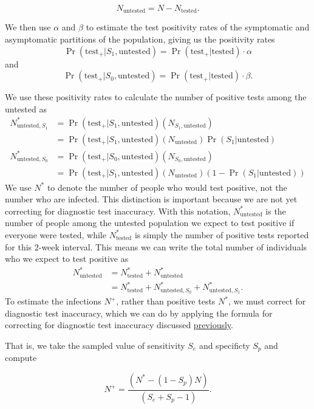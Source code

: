 \documentclass[12pt,twoside]{smiththesis}
\begin{document}
\[ N_{\text{untested}} =  N - N_{\text{tested}} .\]

We then use \(\alpha\) and \(\beta\) to estimate the test positivity rates of the symptomatic and asymptomatic partitions of the population, giving us the positivity rates
\[ \Pr( \text{test}_+ | S_1, \text{untested})  = \Pr( \text{test}_+ | \text{tested}) \cdot  \alpha  \]
and
\[ \Pr( \text{test}_+ | S_0, \text{untested})  = \Pr( \text{test}_+ | \text{tested}) \cdot  \beta. \]

We use these positivity rates to calculate the number of positive tests among the untested as
\begin{align*}
N^*_{\text{untested},S_1} &= \Pr( \text{test}_+ | S_1, \text{untested}) ( N_{S_1,\text{untested}}) \\
&= \Pr( \text{test}_+ | S_1, \text{untested}) (N_{\text{untested}} ) \Pr(S_1|\text{untested})\\
N^*_{\text{untested},S_0} &= \Pr( \text{test}_+ | S_0, \text{untested}) ( N_{S_0,\text{untested}})\\
&= \Pr( \text{test}_+ | S_1, \text{untested}) (N_{\text{untested}} ) (1- \Pr(S_1|\text{untested}))
\end{align*}
We use \(N^*\) to denote the number of people who would test positive, not the number who are infected. This distinction is important because we are not yet correcting for diagnostic test inaccuracy. With this notation, \(N^*_{\text{untested}}\) is the number of people among the untested population we expect to test positive if everyone were tested, while \(N^*_{\text{tested}}\) is simply the number of positive tests reported for this 2-week interval. This means we can write the total number of individuals who we expect to test positive as
\begin{align*}
 N^*_{\text{untested}}
 &= N^*_{\text{tested}} + N^*_{\text{untested}} \\
 &= N^*_{\text{tested}} + N^*_{\text{untested}, S_0} + N^*_{\text{untested}, S_1}.
\end{align*}
To estimate the infections \(N^+\), rather than positive tests \(N^*\), we must correct for diagnostic test inaccuracy, which we can do by applying the formula for correcting for diagnostic test inaccuracy discussed \protect\hyperlink{correct-test-inaccuracy}{previously}.

That is, we take the sampled value of sensitivity \(S_e\) and specificty \(S_p\) and compute

\[N^+ = \dfrac{(N^* - (1 - S_p) N) } { (S_e + S_p - 1) }.\]
\end{document}

